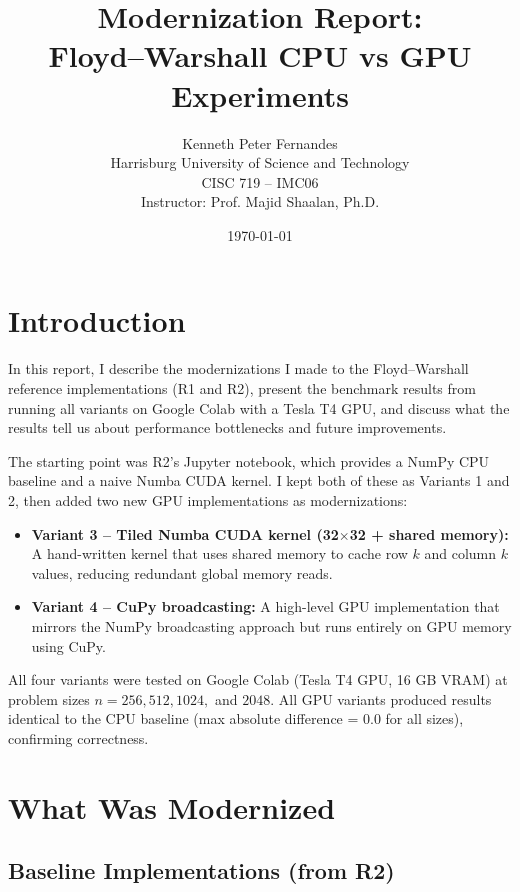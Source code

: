 \documentclass[11pt]{article}
\title{Modernization Report:\\Floyd--Warshall CPU vs GPU Experiments}
\author{Kenneth Peter Fernandes\\Harrisburg University of Science and Technology\\CISC 719 -- IMC06\\Instructor: Prof. Majid Shaalan, Ph.D.}
\date{\today}
\begin{document}
\maketitle

\section{Introduction}

In this report, I describe the modernizations I made to the Floyd--Warshall reference implementations (R1 and R2), present the benchmark results from running all variants on Google Colab with a Tesla T4 GPU, and discuss what the results tell us about performance bottlenecks and future improvements.

The starting point was R2's Jupyter notebook, which provides a NumPy CPU baseline and a naive Numba CUDA kernel. I kept both of these as Variants 1 and 2, then added two new GPU implementations as modernizations:

\begin{itemize}
  \item \textbf{Variant 3 -- Tiled Numba CUDA kernel (32$\times$32 + shared memory):} A hand-written kernel that uses shared memory to cache row $k$ and column $k$ values, reducing redundant global memory reads.
  \item \textbf{Variant 4 -- CuPy broadcasting:} A high-level GPU implementation that mirrors the NumPy broadcasting approach but runs entirely on GPU memory using CuPy.
\end{itemize}

All four variants were tested on Google Colab (Tesla T4 GPU, 16 GB VRAM) at problem sizes $n = 256, 512, 1024,$ and $2048$. All GPU variants produced results identical to the CPU baseline (max absolute difference = 0.0 for all sizes), confirming correctness.

\section{What Was Modernized}

\subsection{Baseline Implementations (from R2)}
\end{document}
